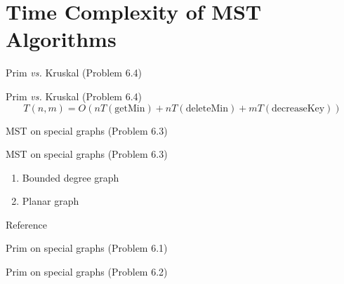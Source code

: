 \section{Time Complexity of MST Algorithms}

\begin{frame}{Prim \emph{vs.} Kruskal (Problem 6.4)}
  \begin{exampleblock}{Prim \emph{vs.} Kruskal (Problem 6.4)}
	\[
	  T(n,m) = O(n T(\text{getMin}) + n T(\text{deleteMin}) + m T(\text{decreaseKey}))
	\]
  \end{exampleblock}
\end{frame}
\begin{frame}{MST on special graphs (Problem 6.3)}
  \begin{exampleblock}{MST on special graphs (Problem 6.3)}
	\begin{enumerate}
	  \item Bounded degree graph
	  \item Planar graph
	\end{enumerate}
  \end{exampleblock}

  \begin{alertblock}{Reference}
  \end{alertblock}
\end{frame}
\begin{frame}{Prim on special graphs (Problem 6.1)}
\end{frame}
\begin{frame}{Prim on special graphs (Problem 6.2)}
\end{frame}

